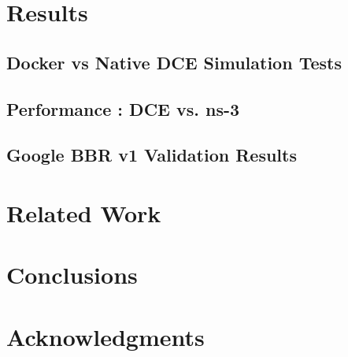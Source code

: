\documentclass{sig-alternate}
\begin{document}
\section{Results}

\subsection{Docker vs Native DCE Simulation Tests}

\subsection{Performance : DCE vs. ns-3}

\subsection{Google BBR v1 Validation Results}

\section{Related Work}

\section{Conclusions}

\section{Acknowledgments}
%

%
%
\end{document}
